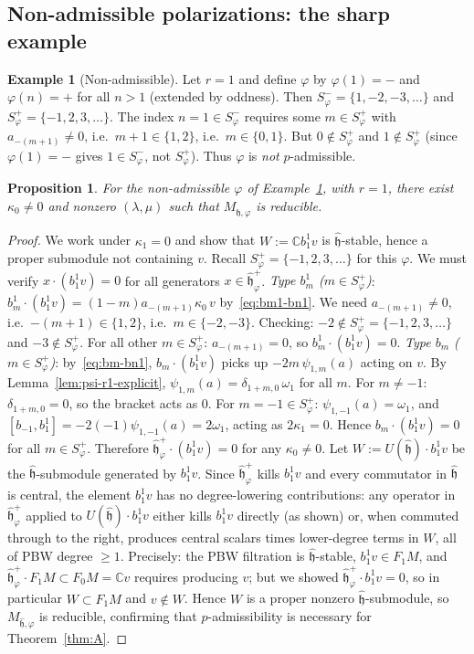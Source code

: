 \documentclass{amsart}
\newcommand{\Cx}{\mathbb{C}}
\newcommand{\h}{\mathfrak{h}}
\newcommand{\wh}[1]{\widehat{#1}}
\newcommand{\whh}{\wh{\h}}
\newtheorem{proposition}[theorem]{Proposition}
\theoremstyle{definition}
\newtheorem{example}[theorem]{Example}
\theoremstyle{remark}
\numberwithin{equation}{section}
\begin{document}
\subsection{Non-admissible polarizations: the sharp example}
\begin{example}[Non-admissible]\label{ex:nonadmissible}
Let $r=1$ and define $\varphi$ by $\varphi(1)=-$ and $\varphi(n)=+$
for all $n>1$ (extended by oddness).  Then
$S_\varphi^-=\{1,-2,-3,\dots\}$ and $S_\varphi^+=\{-1,2,3,\dots\}$.
The index $n=1\in S_\varphi^-$ requires some $m\in S_\varphi^+$ with
$a_{-(m+1)}\neq0$, i.e.\ $m+1\in\{1,2\}$, i.e.\ $m\in\{0,1\}$.
But $0\notin S_\varphi^+$ and $1\notin S_\varphi^+$ (since $\varphi(1)=-$
gives $1\in S_\varphi^-$, not $S_\varphi^+$).  Thus $\varphi$ is
\emph{not} $p$-admissible.
\end{example}
\begin{proposition}\label{prop:nonadmissible-reducible}
For the non-admissible $\varphi$ of Example~\ref{ex:nonadmissible},
with $r=1$, there exist $\kappa_0\neq0$ and nonzero $(\lambda,\mu)$ such
that $M_{\whh,\varphi}$ is reducible.
\end{proposition}
\begin{proof}
We work under $\kappa_1=0$ and show that $W:=\Cx b_1^1 v$ is
$\whh$-stable, hence a proper submodule not containing $v$.
Recall $S_\varphi^+=\{-1,2,3,\dots\}$ for this $\varphi$.
We must verify $x\cdot(b_1^1v)=0$ for all generators $x\in\whh_\varphi^+$.
\emph{Type $b_m^1$ ($m\in S_\varphi^+$)}:
$b_m^1\cdot(b_1^1v)=(1-m)a_{-(m+1)}\kappa_0\,v$ by~\eqref{eq:bm1-bn1}.
We need $a_{-(m+1)}\neq0$, i.e.\ $-(m+1)\in\{1,2\}$, i.e.\
$m\in\{-2,-3\}$.  Checking: $-2\notin S_\varphi^+=\{-1,2,3,\dots\}$ and
$-3\notin S_\varphi^+$.  For all other $m\in S_\varphi^+$:
$a_{-(m+1)}=0$, so $b_m^1\cdot(b_1^1 v)=0$. \checkmark
\emph{Type $b_m$ ($m\in S_\varphi^+$)}: by~\eqref{eq:bm-bn1},
$b_m\cdot(b_1^1 v)$ picks up $-2m\,\psi_{1,m}(a)$ acting on $v$.
By Lemma~\ref{lem:psi-r1-explicit}, $\psi_{1,m}(a)=\delta_{1+m,0}\,\omega_1$
for all $m$.  For $m\neq-1$: $\delta_{1+m,0}=0$, so the bracket acts
as $0$.  For $m=-1\in S_\varphi^+$: $\psi_{1,-1}(a)=\omega_1$, and
$[b_{-1},b_1^1]=-2(-1)\psi_{1,-1}(a)=2\omega_1$, acting as $2\kappa_1=0$.
Hence $b_m\cdot(b_1^1 v)=0$ for all $m\in S_\varphi^+$. \checkmark
Therefore $\whh_\varphi^+\cdot(b_1^1 v)=0$ for any $\kappa_0\neq0$.
Let $W:=U(\whh)\cdot b_1^1v$ be the $\whh$-submodule generated by $b_1^1v$.
Since $\whh_\varphi^+$ kills $b_1^1v$ and every commutator in $\whh$ is
central, the element $b_1^1v$ has no degree-lowering contributions: any
operator in $\whh_\varphi^+$ applied to $U(\whh)\cdot b_1^1v$ either kills
$b_1^1v$ directly (as shown) or, when commuted through to the right, produces
central scalars times lower-degree terms in $W$, all of PBW degree $\ge1$.
Precisely: the PBW filtration is $\whh$-stable, $b_1^1v\in F_1M$, and
$\whh_\varphi^+\cdot F_1M\subset F_0M=\Cx v$ requires producing $v$; but
we showed $\whh_\varphi^+\cdot b_1^1v=0$, so in particular $W\subset F_1M$
and $v\notin W$.  Hence $W$ is a proper nonzero $\whh$-submodule, so
$M_{\whh,\varphi}$ is reducible, confirming that $p$-admissibility is
necessary for Theorem~\ref{thm:A}.
\end{proof}
\end{document}
